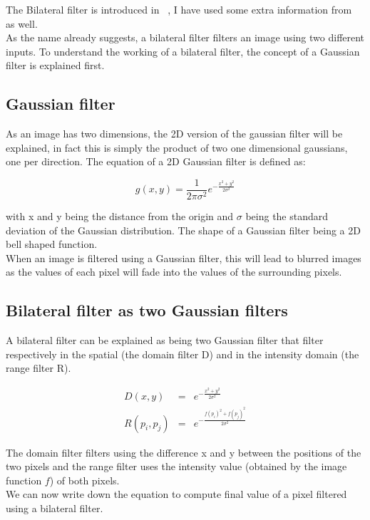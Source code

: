 The Bilateral filter is introduced in ~\cite{710815}, I have used some extra information from ~\cite{bilfilter} as well.
\\
As the name already suggests, a bilateral filter filters an image using two different inputs.
To understand the working of a bilateral filter, the concept of a Gaussian filter is explained first.

\subsection{Gaussian filter}
As an image has two dimensions, the 2D version of the gaussian filter will be explained, in fact this is simply the product of two one dimensional gaussians, one per direction.
The equation of a 2D Gaussian filter is defined as:

\begin{equation}
   g(x,y) = \frac{1}{2\pi\sigma^2}e^{-\frac{x^{2}+y^{2}}{2\sigma^{2}}}
\end{equation}

with x and y being the distance from the origin and $\sigma$ being the standard deviation of the Gaussian distribution.
The shape of a Gaussian filter being a 2D bell shaped function.
\\
When an image is filtered using a Gaussian filter, this will lead to blurred images as the values of each pixel will fade into the values of the surrounding pixels.

\subsection{Bilateral filter as two Gaussian filters}
A bilateral filter can be explained as being two Gaussian filter that filter respectively in the spatial (the domain filter D) and in the intensity domain (the range filter R).

\begin{equation}
  \begin{aligned}
    D(x,y) &=& e^{-\frac{x^{2}+y^{2}}{2\sigma^{2}}} \\
    R(p_i, p_j) &=& e^{-\frac{f(p_i)^{2}+f(p_j)^{2}}{2\sigma^{2}}}
  \end{aligned}
\end{equation}

The domain filter filters using the difference x and y between the positions of the two pixels and the range filter uses the intensity value (obtained by the image function $f$) of both pixels.
\\
We can now write down the equation to compute final value of a pixel filtered using a bilateral filter.

